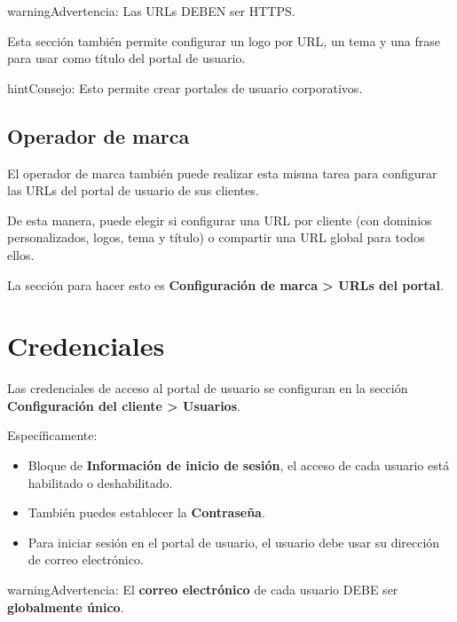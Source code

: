 \documentclass[letterpaper,10pt,spanish]{sphinxmanual}
\begin{document}
\begin{notice}{warning}{Advertencia:}
Las URLs DEBEN ser HTTPS.
\end{notice}

Esta sección también permite configurar un logo por URL, un tema y una frase para usar como título del portal de usuario.

\begin{notice}{hint}{Consejo:}
Esto permite crear portales de usuario corporativos.
\end{notice}


\subsection{Operador de marca}
\label{user_portal/urls:brand-operator}
El operador de marca también puede realizar esta misma tarea para configurar las URLs del portal de usuario de sus clientes.

De esta manera, puede elegir si configurar una URL por cliente (con dominios personalizados, logos, tema y título) o compartir una URL global para todos ellos.

La sección para hacer esto es \textbf{Configuración de marca \textgreater{} URLs del portal}.


\section{Credenciales}
\label{user_portal/credentials:credentials}\label{user_portal/credentials::doc}
Las credenciales de acceso al portal de usuario se configuran en la sección \textbf{Configuración del cliente \textgreater{} Usuarios}.

Específicamente:
\begin{itemize}
\item {} 
Bloque de \textbf{Información de inicio de sesión}, el acceso de cada usuario está habilitado o deshabilitado.

\item {} 
También puedes establecer la \textbf{Contraseña}.

\item {} 
Para iniciar sesión en el portal de usuario, el usuario debe usar su dirección de correo electrónico.

\end{itemize}

\begin{notice}{warning}{Advertencia:}
El \textbf{correo electrónico} de cada usuario DEBE ser \textbf{globalmente único}.
\end{notice}
\end{document}
